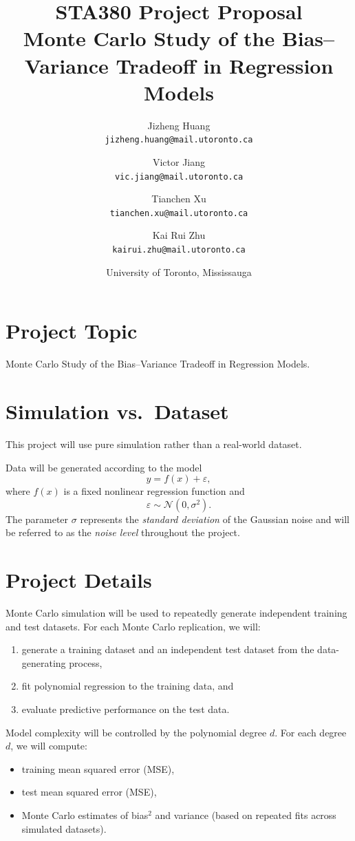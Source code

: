 \documentclass[11pt]{article}
\title{\textbf{STA380 Project Proposal}\\
Monte Carlo Study of the Bias--Variance Tradeoff in Regression Models}
\author{
Jizheng Huang \\
\texttt{jizheng.huang@mail.utoronto.ca}
\and
Victor Jiang \\
\texttt{vic.jiang@mail.utoronto.ca}
\and
Tianchen Xu \\
\texttt{tianchen.xu@mail.utoronto.ca}
\and
Kai Rui Zhu \\
\texttt{kairui.zhu@mail.utoronto.ca}
}
\date{University of Toronto, Mississauga}
\begin{document}
\maketitle

\section{Project Topic}
Monte Carlo Study of the Bias--Variance Tradeoff in Regression Models.


\section{Simulation vs.\ Dataset}
This project will use pure simulation rather than a real-world dataset.

Data will be generated according to the model
\[
y = f(x) + \varepsilon,
\]
where $f(x)$ is a fixed nonlinear regression function and
\[
\varepsilon \sim \mathcal{N}(0, \sigma^2).
\]
The parameter $\sigma$ represents the \emph{standard deviation} of the Gaussian noise and will be referred to as the
\emph{noise level} throughout the project.

\section{Project Details}
Monte Carlo simulation will be used to repeatedly generate independent training and test datasets. For each Monte Carlo
replication, we will:
\begin{enumerate}
    \item generate a training dataset and an independent test dataset from the data-generating process,
    \item fit polynomial regression to the training data, and
    \item evaluate predictive performance on the test data.
\end{enumerate}

Model complexity will be controlled by the polynomial degree $d$. For each degree $d$, we will compute:
\begin{itemize}
    \item training mean squared error (MSE),
    \item test mean squared error (MSE),
    \item Monte Carlo estimates of bias$^2$ and variance (based on repeated fits across simulated datasets).
\end{itemize}
\end{document}
